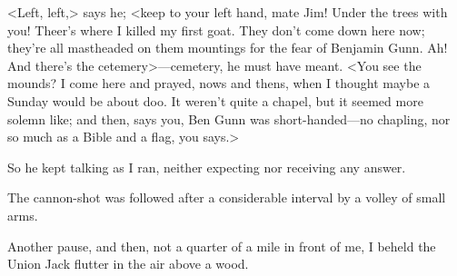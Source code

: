 <Left, left,> says he; <keep to your left hand, mate Jim! Under the trees with you! Theer's where I killed my first goat. They don't come down here now; they're all mastheaded on them mountings for the fear of Benjamin Gunn. Ah! And there's the cetemery>—cemetery, he must have meant. <You see the mounds? I come here and prayed, nows and thens, when I thought maybe a Sunday would be about doo. It weren't quite a chapel, but it seemed more solemn like; and then, says you, Ben Gunn was short-handed—no chapling, nor so much as a Bible and a flag, you says.>

So he kept talking as I ran, neither expecting nor receiving any answer.

The cannon-shot was followed after a considerable interval by a volley of small arms.

Another pause, and then, not a quarter of a mile in front of me, I beheld the Union Jack flutter in the air above a wood.